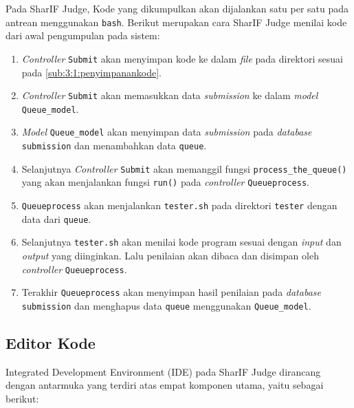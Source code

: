 Pada SharIF Judge, Kode yang dikumpulkan akan dijalankan satu per satu pada antrean menggunakan \verb|bash|. Berikut merupakan cara SharIF Judge menilai kode dari awal pengumpulan pada sistem:

\begin{enumerate}
	\item \textit{Controller} \verb|Submit| akan menyimpan kode ke dalam \textit{file} pada direktori sesuai pada \ref{sub:3:1:penyimpanankode}.
	\item \textit{Controller} \verb|Submit| akan memasukkan data \textit{submission} ke dalam \textit{model} \verb|Queue_model|.
	\item \textit{Model} \verb|Queue_model| akan menyimpan data \textit{submission} pada \textit{database} \verb|submission| dan menambahkan data \verb|queue|.
	\item Selanjutnya \textit{Controller} \verb|Submit| akan memanggil fungsi \verb|process_the_queue()| yang akan menjalankan fungsi \verb|run()| pada \textit{controller} \verb|Queueprocess|.
	\item \verb|Queueprocess| akan menjalankan \verb|tester.sh| pada direktori \verb|tester| dengan data dari \verb|queue|.
	\item Selanjutnya \verb|tester.sh| akan menilai kode program sesuai dengan \textit{input} dan \textit{output} yang diinginkan. Lalu penilaian akan dibaca dan disimpan oleh \textit{controller} \verb|Queueprocess|.
	\item Terakhir \verb|Queueprocess| akan menyimpan hasil penilaian pada \textit{database} \verb|submission| dan menghapus data \verb|queue| menggunakan \verb|Queue_model|.
\end{enumerate}

\subsection{Editor Kode}

Integrated Development Environment (IDE) pada SharIF Judge dirancang dengan antarmuka yang terdiri atas empat komponen utama, yaitu sebagai berikut:

